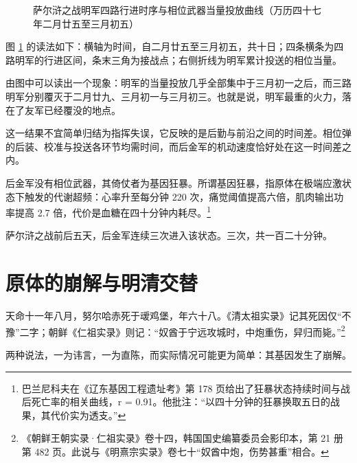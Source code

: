 \begin{figure}[htbp]
\caption{萨尔浒之战明军四路行进时序与相位武器当量投放曲线（万历四十七年二月廿五至三月初五）}
\label{fig:sarhu}
\end{figure}

图 \ref{fig:sarhu} 的读法如下：横轴为时间，自二月廿五至三月初五，共十日；四条横条为四路明军的行进区间，条末三角为接战点；右侧折线为明军累计投送的相位当量。

由图中可以读出一个现象：明军的当量投放几乎全部集中于三月初一之后，而三路明军分别覆灭于二月廿九、三月初一与三月初三。也就是说，明军最重的火力，落在了友军已经覆没的地点。

这一结果不宜简单归结为指挥失误，它反映的是后勤与前沿之间的时间差。相位弹的后装、校准与投送各环节均需时间，而后金军的机动速度恰好处在这一时间差之内。

后金军没有相位武器，其倚仗者为基因狂暴。所谓基因狂暴，指原体在极端应激状态下触发的代谢超频：心率升至每分钟 220 次，痛觉阈值提高六倍，肌肉输出功率提高 2.7 倍，代价是血糖在四十分钟内耗尽。\footnote{巴兰尼科夫在《辽东基因工程遗址考》第 178 页给出了狂暴状态持续时间与战后死亡率的相关曲线，r = 0.91。他批注：“以四十分钟的狂暴换取五日的战果，其代价实为透支。”}

萨尔浒之战前后五天，后金军连续三次进入该状态。三次，共一百二十分钟。

\section{原体的崩解与明清交替}

天命十一年八月，努尔哈赤死于叆鸡堡，年六十八。《清太祖实录》记其死因仅“不豫”二字；朝鲜《仁祖实录》则记：“奴酋于宁远攻城时，中炮重伤，舁归而毙。”\footnote{《朝鲜王朝实录·仁祖实录》卷十四，韩国国史编纂委员会影印本，第 21 册第 482 页。此说与《明熹宗实录》卷七十“奴酋中炮，伤势甚重”相合。}

两种说法，一为讳言，一为直陈，而实际情况可能更为简单：其基因发生了崩解。


